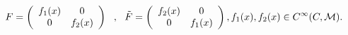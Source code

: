 \begin{equation}\label{TILD}
F = \left(\begin{array}{cc}
  f_1(x) & 0 \\
  0      & f_2(x)
\end{array}
\right) ~~,~~ {\tilde F} = \left( \begin{array}{cc}
  f_2(x) & 0 \\
  0 & f_1(x)
\end{array} \right), f_1(x), f_2(x) \in C^\infty( C, {\cal M}).
\end{equation}


